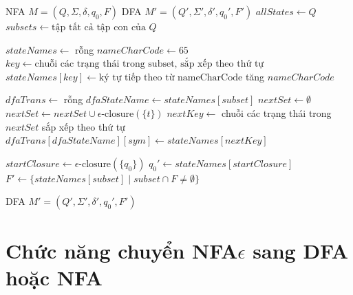 \documentclass[12pt,a4paper]{report}
\begin{document}
\begin{algorithm}[H]
\caption{Chuyển NFAsang DFA bằng thuật toán tập con (Subset Construction)}
\begin{algorithmic}[1]
\Require NFA $M = (Q, \Sigma, \delta, q_0, F)$
\Ensure DFA $M' = (Q', \Sigma', \delta', q_0', F')$
\State $allStates \gets Q$
\State $subsets \gets \text{tập tất cả tập con của } Q$

\State $stateNames \gets$ rỗng
\State $nameCharCode \gets 65$ 
    \State $key \gets \text{chuỗi các trạng thái trong subset, sắp xếp theo thứ tự}$
    \State $stateNames[key] \gets \text{ký tự tiếp theo từ nameCharCode}$
    \State tăng $nameCharCode$
\EndFor

\State $dfaTrans \gets$ rỗng
    \State $dfaStateName \gets stateNames[subset]$
        \State $nextSet \gets \emptyset$
                    \State $nextSet \gets nextSet \cup \epsilon\text{-closure}(\{t\})$
                \EndFor
            \EndIf
        \EndFor
            \State $nextKey \gets$ chuỗi các trạng thái trong $nextSet$ sắp xếp theo thứ tự
            \State $dfaTrans[dfaStateName][sym] \gets stateNames[nextKey]$
        \EndIf
    \EndFor
\EndFor

\State $startClosure \gets \epsilon\text{-closure}(\{q_0\})$
\State $q_0' \gets stateNames[startClosure]$
\State $F' \gets \{ stateNames[subset] \mid subset \cap F \neq \emptyset \}$

\State \Return DFA $M' = (Q', \Sigma', \delta', q_0', F')$
\end{algorithmic}
\end{algorithm}

\section{Chức năng chuyển NFA$\epsilon$ sang DFA hoặc NFA}
\end{document}
